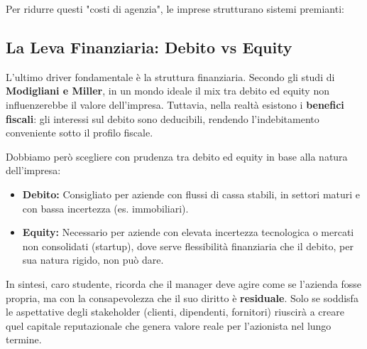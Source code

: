 \documentclass[a4paper,10pt]{article}
\begin{document}
Per ridurre questi "costi di agenzia", le imprese strutturano sistemi premianti:
\begin{table}[H]
\setlength{\extrarowheight}{10pt}
\caption{Incentivi e monitoraggio nella Corporate Governance}
\end{table}

\subsection*{La Leva Finanziaria: Debito vs Equity}

L'ultimo driver fondamentale è la struttura finanziaria. Secondo gli studi di \textbf{Modigliani e Miller}, in un mondo ideale il mix tra debito ed equity non influenzerebbe il valore dell'impresa. Tuttavia, nella realtà esistono i \textbf{benefici fiscali}: gli interessi sul debito sono deducibili, rendendo l'indebitamento conveniente sotto il profilo fiscale.

Dobbiamo però scegliere con prudenza tra debito ed equity in base alla natura dell'impresa:
\begin{itemize}
    \item \textbf{Debito:} Consigliato per aziende con flussi di cassa stabili, in settori maturi e con bassa incertezza (es. immobiliari).
    \item \textbf{Equity:} Necessario per aziende con elevata incertezza tecnologica o mercati non consolidati (startup), dove serve flessibilità finanziaria che il debito, per sua natura rigido, non può dare.
\end{itemize}

In sintesi, caro studente, ricorda che il manager deve agire come se l'azienda fosse propria, ma con la consapevolezza che il suo diritto è \textbf{residuale}. Solo se soddisfa le aspettative degli stakeholder (clienti, dipendenti, fornitori) riuscirà a creare quel capitale reputazionale che genera valore reale per l'azionista nel lungo termine.
\end{document}
